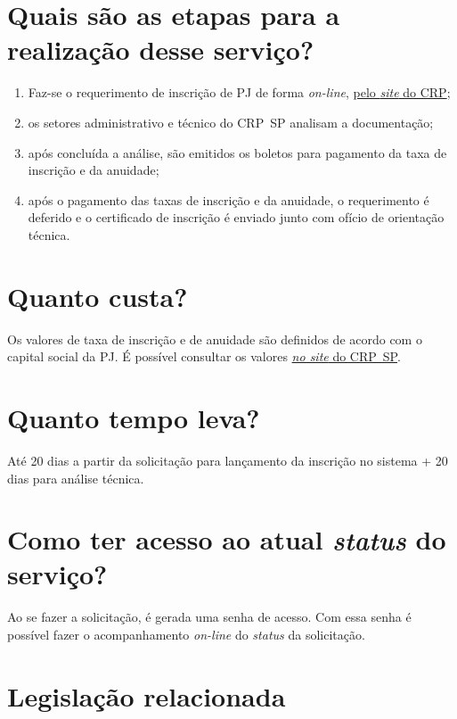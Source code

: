 \section{Quais são as etapas para a realização desse serviço?}

\begin{enumerate}
  \item  Faz-se o requerimento de inscrição de PJ de forma \emph{on-line},  \href{https://www.crpsp.org/pagina/view/30}{pelo \emph{site} do CRP};
  \item  os setores administrativo e técnico do CRP~SP analisam a documentação;
  \item  após concluída a análise, são emitidos os boletos para pagamento da  taxa de inscrição e da anuidade;
  \item  após o pagamento das taxas de inscrição e da anuidade, o requerimento  é deferido e o certificado de inscrição é enviado junto com ofício de orientação técnica.
\end{enumerate}

\section{Quanto custa?}

Os valores de taxa de inscrição e de anuidade são definidos de acordo com o capital social da PJ. É possível consultar os valores \href{https://www.crpsp.org/pagina/view/207}{\emph{no site} do CRP~SP}.

\section{Quanto tempo leva?}

Até 20 dias a partir da solicitação para lançamento da inscrição no sistema + 20 dias para análise técnica.

\section{Como ter acesso ao atual \emph{status} do serviço?}

Ao se fazer a solicitação, é gerada uma senha de acesso. Com essa senha é possível fazer o acompanhamento \emph{on-line} do \emph{status} da solicitação.

\section{Legislação relacionada}

